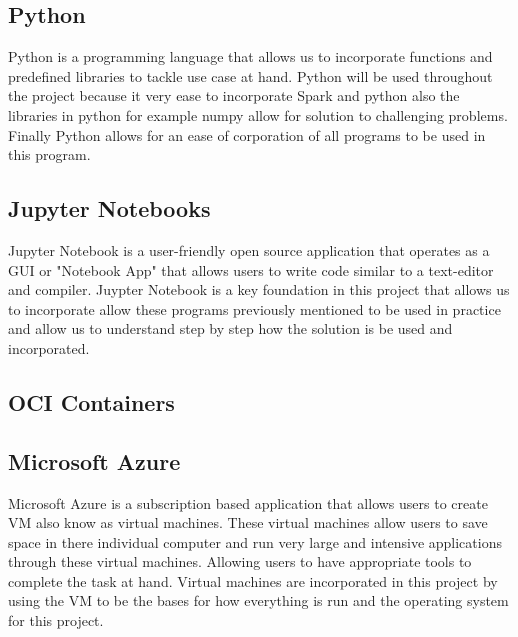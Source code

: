 \documentclass[conference,twoside]{IEEEtran}
\begin{document}
\subsection{Python}
	Python is a programming language that allows us to incorporate functions and predefined libraries to tackle use case at hand. Python will be used throughout the project because it very ease to incorporate Spark and python also the libraries in python for example numpy allow for solution to challenging problems. Finally Python allows for an ease of corporation of all programs to be used in this program.

\subsection{Jupyter Notebooks}
	Jupyter Notebook is a user-friendly open source application that operates as a GUI or "Notebook App" that allows users to write code similar to a text-editor and compiler. Juypter Notebook is a key foundation in this project that allows us to incorporate allow these programs previously mentioned to be used in practice and allow us to understand step by step how the solution is be used and incorporated.


\subsection{OCI Containers}


\subsection{Microsoft Azure}
	Microsoft Azure is a subscription based application that allows users to create VM also know as virtual machines. These virtual machines allow users to save space in there individual computer and run very large and intensive applications through these virtual machines. Allowing users to have appropriate tools to complete the task at hand. Virtual machines are incorporated in this project by using the VM to be the bases for how everything is run and the operating system for this project.
\end{document}

